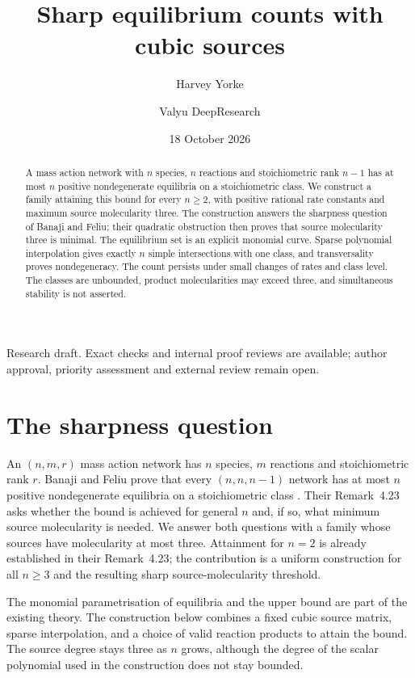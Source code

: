 \documentclass[11pt]{amsart}
\title[Sharp equilibrium counts with cubic sources]{Sharp equilibrium counts with cubic sources}
\author{Harvey Yorke}\address{Valyu AI}
\author{Valyu DeepResearch}\address{Valyu AI}
\date{18 October 2026}
\begin{document}
\raggedbottom
\begin{abstract}
A mass action network with $n$ species, $n$ reactions and stoichiometric
rank $n-1$ has at most $n$ positive nondegenerate equilibria on a
stoichiometric class. We construct a family attaining this bound for every
$n\ge2$, with positive rational rate constants and maximum source
molecularity three. The construction answers the sharpness question of
Banaji and Feliu; their quadratic obstruction then proves that source
molecularity three is minimal. The equilibrium set is an explicit
monomial curve. Sparse polynomial interpolation gives exactly $n$ simple
intersections with one class, and transversality proves nondegeneracy.
The count persists under small changes of rates and class level.
The classes are unbounded, product molecularities may exceed three,
and simultaneous stability is not asserted.
\end{abstract}
\maketitle
\begin{center}\small
Research draft. Exact checks and internal proof reviews are available;
author approval, priority assessment and external review remain open.
\end{center}

\section{The sharpness question}
An $(n,m,r)$ mass action network has $n$ species, $m$ reactions and
stoichiometric rank $r$. Banaji and Feliu prove that every $(n,n,n-1)$
network has at most $n$ positive nondegenerate equilibria on a
stoichiometric class \cite[Corollary~4.21(i)]{banajiFeliu2026}.
Their Remark~4.23 asks whether the bound is achieved for general $n$
and, if so, what minimum source molecularity is needed.
We answer both questions with a family whose sources have molecularity
at most three. Attainment for $n=2$ is already established in their
Remark~4.23; the contribution is a uniform construction for all $n\ge3$
and the resulting sharp source-molecularity threshold.

The monomial parametrisation of equilibria and the upper bound are part
of the existing theory. The construction below combines a fixed cubic
source matrix, sparse interpolation, and a choice of valid reaction
products to attain the bound. The source degree stays three as $n$ grows,
although the degree of the scalar polynomial used in the construction
does not stay bounded.
\end{document}
